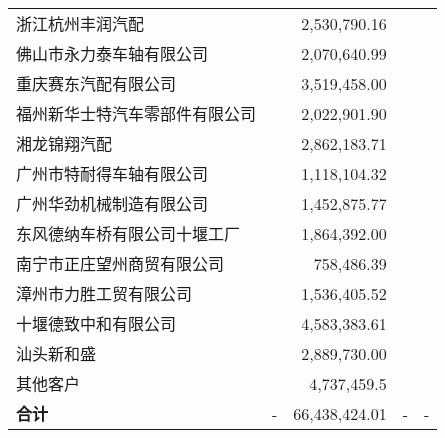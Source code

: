 \begin{longtable}{>{\scriptsize}l>{\scriptsize}r>{\scriptsize}r>{\scriptsize}r>{\scriptsize}r}
浙江杭州丰润汽配 &  &
2,530,790.16 &  & \\
佛山市永力泰车轴有限公司 &  &
2,070,640.99 &  & \\
重庆赛东汽配有限公司 &  &
3,519,458.00 &  & \\
福州新华士特汽车零部件有限公司 &  &
2,022,901.90 &  & \\
湘龙锦翔汽配 &  &
2,862,183.71 &  & \\
广州市特耐得车轴有限公司 &  &
1,118,104.32 &  & \\
广州华劲机械制造有限公司 &  &
1,452,875.77 &  & \\
东风德纳车桥有限公司十堰工厂 &  &
1,864,392.00 &  & \\
南宁市正庄望州商贸有限公司 &  &
758,486.39 &  & \\
漳州市力胜工贸有限公司 &  &
1,536,405.52 &  & \\
十堰德致中和有限公司 &  &
4,583,383.61 &  & \\
汕头新和盛 &  &
2,889,730.00 &  & \\
其他客户 &  &
4,737,459.5  &  & \\
\midrule
\bfseries 合计 & - & 66,438,424.01 & - & -\\
\bottomrule
\end{longtable}

